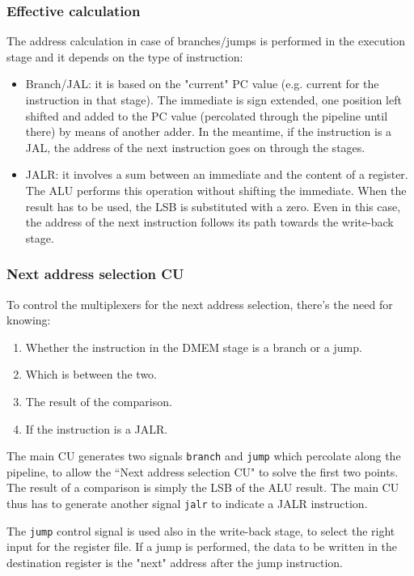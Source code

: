 \documentclass[a4paper]{article}
\begin{document}
\subsubsection{Effective calculation}
The address calculation in case of branches/jumps is performed in the execution stage and it depends on the type of instruction:
\begin{itemize}
    \item Branch/JAL: it is based on the "current" PC value (e.g. current for the instruction in that stage). The immediate is sign extended, one position left shifted and added to the PC value (percolated through the pipeline until there) by means of another adder. In the meantime, if the instruction is a JAL, the address of the next instruction goes on through the stages.
    \item JALR: it involves a sum between an immediate and the content of a register. The ALU performs this operation without shifting the immediate. When the result has to be used, the LSB is substituted with a zero. Even in this case, the address of the next instruction follows its path towards the write-back stage.
\end{itemize}

\subsubsection{Next address selection CU}
To control the multiplexers for the next address selection, there's the need for knowing:
\begin{enumerate}
	\item Whether the instruction in the DMEM stage is a branch or a jump.
	\item Which is between the two.
	\item The result of the comparison.
	\item If the instruction is a JALR.
\end{enumerate}
The main CU generates two signals \texttt{branch} and \texttt{jump} which percolate along the pipeline, to allow the ``Next address selection CU" to solve the first two points. The result of a comparison is simply the LSB of the ALU result.
The main CU thus has to generate another signal \texttt{jalr} to indicate a JALR instruction.

The \texttt{jump} control signal is used also in the write-back stage, to select the right input for the register file. If a jump is performed, the data to be written in the destination register is the "next" address after the jump instruction.
\end{document}
